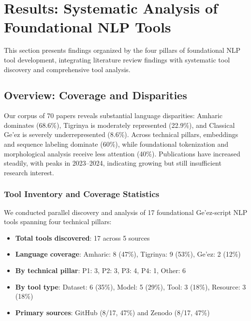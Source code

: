 \documentclass[12pt,a4paper]{article}
\theoremstyle{plain}
\theoremstyle{definition}
\begin{document}

\section{Results: Systematic Analysis of Foundational NLP Tools}
\label{sec:results}

This section presents findings organized by the four pillars of foundational NLP tool development, integrating literature review findings with systematic tool discovery and comprehensive tool analysis.

\subsection{Overview: Coverage and Disparities}

Our corpus of 70 papers reveals substantial language disparities: Amharic dominates (68.6\%), Tigrinya is moderately represented (22.9\%), and Classical Ge'ez is severely underrepresented (8.6\%). Across technical pillars, embeddings and sequence labeling dominate (60\%), while foundational tokenization and morphological analysis receive less attention (40\%). Publications have increased steadily, with peaks in 2023--2024, indicating growing but still insufficient research interest.

\subsubsection{Tool Inventory and Coverage Statistics}

We conducted parallel discovery and analysis of 17 foundational Ge'ez-script NLP tools spanning four technical pillars:

\begin{itemize}
\item \textbf{Total tools discovered}: 17 across 5 sources
\item \textbf{Language coverage}: Amharic: 8 (47\%), Tigrinya: 9 (53\%), Ge'ez: 2 (12\%)
\item \textbf{By technical pillar}: P1: 3, P2: 3, P3: 4, P4: 1, Other: 6
\item \textbf{By tool type}: Dataset: 6 (35\%), Model: 5 (29\%), Tool: 3 (18\%), Resource: 3 (18\%)
\item \textbf{Primary sources}: GitHub (8/17, 47\%) and Zenodo (8/17, 47\%)
\end{itemize}
\end{document}
